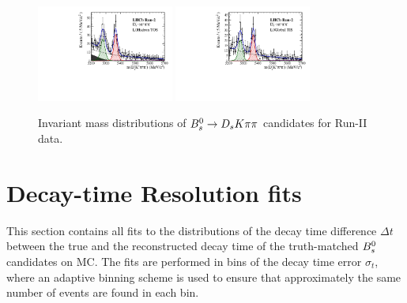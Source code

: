 \begin{figure}[h]
\includegraphics[height=!,width=0.4\textwidth]{figs/MassFit/signal_Run2_pipipi_t0.pdf}
\includegraphics[height=!,width=0.4\textwidth]{figs/MassFit/signal_Run2_pipipi_t1.pdf}

\caption{Invariant mass distributions of ${{B}^0_{s}}\rightarrow{\ensuremath{{D}_{s}}} K{\pi}{\pi}$ candidates for Run-II data.}
\label{fig:massfits_signal_Run2}
\end{figure}


\clearpage
\section{Decay-time Resolution fits}
\label{sec:DecResFits}

This section contains all fits to the distributions of the decay time difference $\Delta t$ between the true and the reconstructed decay time of the truth-matched ${{B}^0_{s}}$ candidates on MC.
The fits are performed in bins of the decay time error $\sigma_{t}$, where an adaptive binning scheme is used to ensure that approximately the same number of events are found in each bin. 

